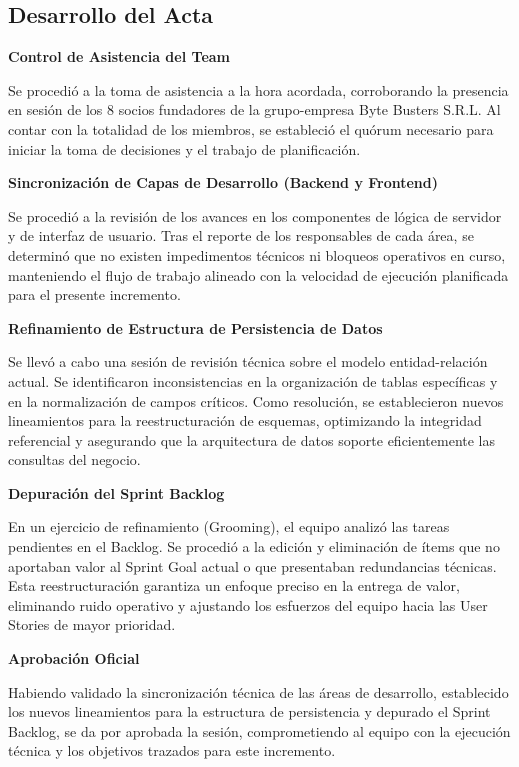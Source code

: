 \newpage
\subsection{Desarrollo del Acta}

\noindent \textbf{Control de Asistencia del Team}\par
Se procedió a la toma de asistencia a la hora acordada, corroborando la presencia en sesión de los 8 socios fundadores de la grupo-empresa Byte Busters S.R.L. Al contar con la totalidad de los miembros, se estableció el quórum necesario para iniciar la toma de decisiones y el trabajo de planificación.

\vspace*{0.5cm}
\noindent \textbf{Sincronización de Capas de Desarrollo (Backend y Frontend)}\par
Se procedió a la revisión de los avances en los componentes de lógica de servidor y de interfaz de usuario. Tras el reporte de los responsables de cada área, se determinó que no existen impedimentos técnicos ni bloqueos operativos en curso, manteniendo el flujo de trabajo alineado con la velocidad de ejecución planificada para el presente incremento.

\vspace*{0.5cm}
\noindent \textbf{Refinamiento de Estructura de Persistencia de Datos}\par
Se llevó a cabo una sesión de revisión técnica sobre el modelo entidad-relación actual. Se identificaron inconsistencias en la organización de tablas específicas y en la normalización de campos críticos. Como resolución, se establecieron nuevos lineamientos para la reestructuración de esquemas, optimizando la integridad referencial y asegurando que la arquitectura de datos soporte eficientemente las consultas del negocio.

\vspace*{0.5cm}
\noindent \textbf{Depuración del Sprint Backlog}\par
En un ejercicio de refinamiento (Grooming), el equipo analizó las tareas pendientes en el Backlog. Se procedió a la edición y eliminación de ítems que no aportaban valor al Sprint Goal actual o que presentaban redundancias técnicas. Esta reestructuración garantiza un enfoque preciso en la entrega de valor, eliminando ruido operativo y ajustando los esfuerzos del equipo hacia las User Stories de mayor prioridad.

\vspace*{0.5cm}
\noindent \textbf{Aprobación Oficial}\par
Habiendo validado la sincronización técnica de las áreas de desarrollo, establecido los nuevos lineamientos para la estructura de persistencia y depurado el Sprint Backlog, se da por aprobada la sesión, comprometiendo al equipo con la ejecución técnica y los objetivos trazados para este incremento.

